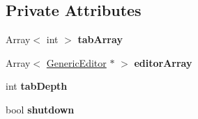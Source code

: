 \subsection*{Private Attributes}
\begin{DoxyCompactItemize}
\item 
\hypertarget{classDataViewport_aed6c8f52223b4a0f18522b5d955ebb78}{Array$<$ int $>$ {\bfseries tab\-Array}}\label{classDataViewport_aed6c8f52223b4a0f18522b5d955ebb78}

\item 
\hypertarget{classDataViewport_af20639966e4c4ac17eeaf2ff76fb4067}{Array$<$ \hyperlink{classGenericEditor}{Generic\-Editor} $\ast$ $>$ {\bfseries editor\-Array}}\label{classDataViewport_af20639966e4c4ac17eeaf2ff76fb4067}

\item 
\hypertarget{classDataViewport_a1ede587e57426d557975837ecef551f4}{int {\bfseries tab\-Depth}}\label{classDataViewport_a1ede587e57426d557975837ecef551f4}

\item 
\hypertarget{classDataViewport_a5e55f6f3324b280f3e26993b52ba3192}{bool {\bfseries shutdown}}\label{classDataViewport_a5e55f6f3324b280f3e26993b52ba3192}

\end{DoxyCompactItemize}


